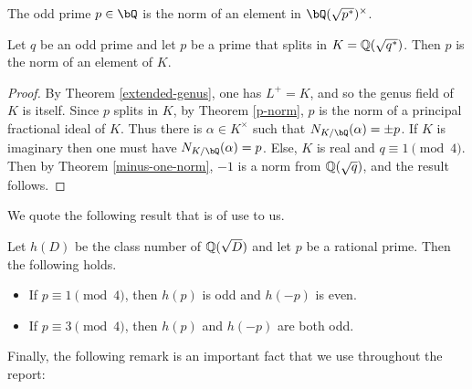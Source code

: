 \begin{cor}\label{p-norm}
The odd prime $p \in \bQ$ is the norm of an element in $\bQ(\sqrt{p^*})^{\times}$.
\end{cor}

\begin{cor}\label{cor_psplit_pnorm}
    Let $q$ be an odd prime and let $p$ be a prime that splits in $K = \mathbb{Q}(\sqrt{q^*})$. Then $p$ is the norm of an element of $K$. 
\end{cor}
\begin{proof}
    By Theorem \ref{extended-genus}, one has $L^{+} = K$, and so the genus field of $K$ is itself. Since $p$ splits in $K$, by Theorem \ref{p-norm}, $p$ is the norm of a principal fractional ideal of $K$. Thus there is $\alpha \in K^{\times}$ such that $N_{K / \bQ}(\alpha) = \pm p$.
    If $K$ is imaginary then one must have $N_{K / \bQ}(\alpha) = p$. Else, $K$ is real and $q \equiv 1 \pmod 4$. Then by Theorem \ref{minus-one-norm}, $-1$ is a norm from $\mathbb{Q}(\sqrt{q})$, and the result follows.
\end{proof}

We quote the following result that is of use to us.

\begin{thm}\label{thm_class_number}
    Let $h(D)$ be the class number of $\mathbb{Q}(\sqrt{D})$ and let $p$ be a rational prime. Then the following holds.
    \begin{itemize}
        \item If $p\equiv1\pmod{4}$, then $h(p)$ is odd and $h(-p)$ is even.
        \item If $p\equiv3\pmod{4}$, then $h(p)$ and $h(-p)$ are both odd.
    \end{itemize}
\end{thm}
Finally, the following remark is an important fact that we use throughout the report:

